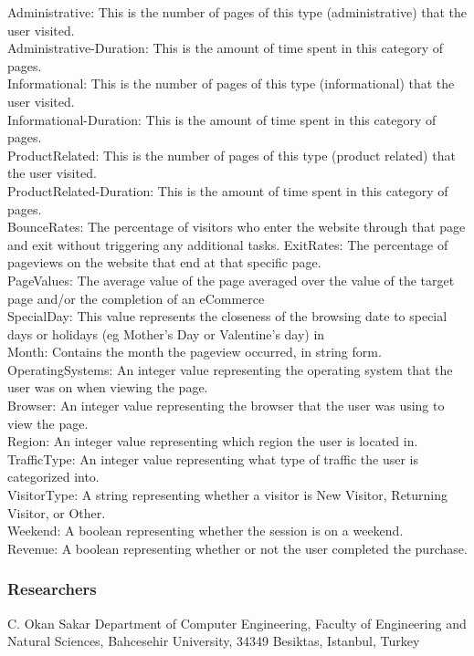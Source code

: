 \documentclass[onecolumn]{article}
\begin{document}
Administrative: This is the number of pages of this type (administrative) that the user visited.\\
Administrative-Duration: This is the amount of time spent in this category of pages.\\
Informational: This is the number of pages of this type (informational) that the user visited.\\
Informational-Duration: This is the amount of time spent in this category of pages.\\
ProductRelated: This is the number of pages of this type (product related) that the user visited.\\
ProductRelated-Duration: This is the amount of time spent in this category of pages.\\
BounceRates: The percentage of visitors who enter the website through that page and exit without triggering any additional tasks.
ExitRates: The percentage of pageviews on the website that end at that specific page.\\
PageValues: The average value of the page averaged over the value of the target page and/or the completion of an eCommerce\\
SpecialDay: This value represents the closeness of the browsing date to special days or holidays (eg Mother's Day or Valentine's day) in\\
Month: Contains the month the pageview occurred, in string form.\\
OperatingSystems: An integer value representing the operating system that the user was on when viewing the page.\\
Browser: An integer value representing the browser that the user was using to view the page.\\
Region: An integer value representing which region the user is located in.\\
TrafficType: An integer value representing what type of traffic the user is categorized into.\\
VisitorType: A string representing whether a visitor is New Visitor, Returning Visitor, or Other.\\
Weekend: A boolean representing whether the session is on a weekend.\\
Revenue: A boolean representing whether or not the user completed the purchase.\\

\subsubsection{Researchers}
C. Okan Sakar Department of Computer Engineering, Faculty of Engineering and Natural Sciences, Bahcesehir University, 34349 Besiktas, Istanbul, Turkey\\
\end{document}
